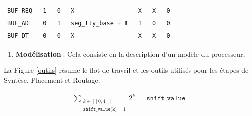 \documentclass{article}
\begin{document}
\begin{table}[H]
\begin{minipage}{.6\linewidth}
\begin{tabular}{|l|l|l|l|l|l|l|}
\tt{BUF\_REQ}     & \tt{1}         & \tt{0}         & \tt{X}                  & \tt{X}             & \tt{X}         & \tt{0}         \\
\tt{BUF\_AD}      & \tt{0}         & \tt{1}         & \tt{seg\_tty\_base + 8} & \tt{1}             & \tt{0}         & \tt{0}         \\
\tt{BUF\_DT}      & \tt{0}         & \tt{0}         & \tt{X}                  & \tt{X}             & \tt{X}         & \tt{0}         \\
\hline
\end{tabular}
\end{minipage}
\endgroup
\label{standard}
\end{table}

\begin{enumerate}
\item \textbf{Modélisation}  : Cela consiste en la description d'un modèle du processeur,
\end{enumerate}

La Figure \ref{outils} résume le flot de travail et les outils utilisés pour les étapes de Syntèse,
Placement et Routage.

\begin{eqnarray*}
  \sum_{\substack{k \in [[0, 4]] \\ \texttt{shift\_value(k)} = 1}} 2^k &= \texttt{shift\_value}
\end{eqnarray*}

%

\end{document}

